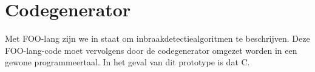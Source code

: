 
\section{Codegenerator}
\label{section:devel-codegen}

Met FOO-lang zijn we in staat om inbraakdetectiealgoritmen te beschrijven. Deze
FOO-lang-code moet vervolgens door de codegenerator omgezet worden in een
gewone programmeertaal. In het geval van dit prototype is dat C.






